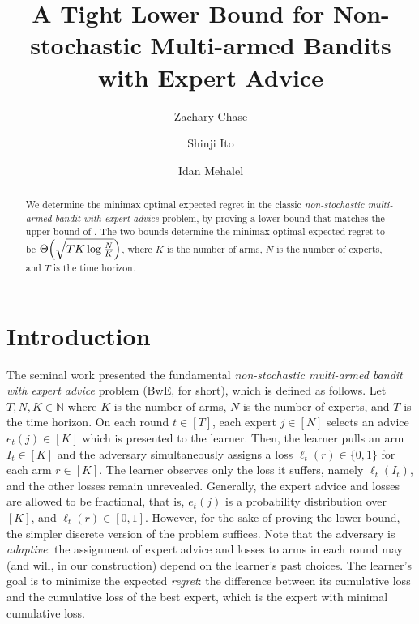 \documentclass[a4paper,11pt]{article}
\theoremstyle{definition}
\begin{document}
\title{A Tight Lower Bound for Non-stochastic Multi-armed Bandits with Expert Advice}

\author[1]{Zachary Chase}
\author[2]{Shinji Ito}
\author[3]{Idan Mehalel}

\maketitle

\begin{abstract}
We determine the minimax optimal expected regret in the classic \emph{non-stochastic multi-armed bandit with expert advice} problem, by proving a lower bound that matches the upper bound of \cite{kale2014multiarmed}. The two bounds determine the minimax optimal expected regret to be $\Theta\mleft( \sqrt{T K \log \frac{N}{K} } \mright)$, where $K$ is the number of arms, $N$ is the number of experts, and $T$ is the time horizon.
\end{abstract}


\section{Introduction}
The seminal work \cite{auer2002nonstochastic} presented the fundamental \emph{non-stochastic multi-armed bandit with expert advice} problem (BwE, for short), which is defined as follows. Let $T,N,K \in \mathbb{N}$ where $K$ is the number of arms, $N$ is the number of experts, and $T$ is the time horizon.  On each round $t \in [T]$, each expert $j \in [N]$ selects an advice $e_t(j) \in [K]$ which is presented to the learner. Then, the learner pulls an arm $I_t \in [K]$ and the adversary simultaneously assigns a loss $\ell_t(r) \in \{0,1\}$ for each arm $r \in [K]$. The learner observes only the loss it suffers, namely $\ell_t(I_t)$, and the other losses remain unrevealed. Generally, the expert advice and losses are allowed to be fractional, that is, $e_t(j)$ is a probability distribution over $[K]$, and $\ell_t(r) \in [0,1]$. However, for the sake of proving the lower bound, the simpler discrete version of the problem suffices. Note that the adversary is \emph{adaptive}: the assignment of expert advice and losses to arms in each round may (and will, in our construction) depend on the learner's past choices. The learner's goal is to minimize the expected \emph{regret}: the difference between its cumulative loss and the cumulative loss of the best expert, which is the expert with minimal cumulative loss.
\end{document}
